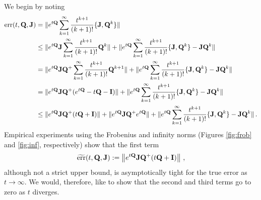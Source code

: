 \documentclass[12pt]{article} %
\begin{document}
We begin by noting
\begin{align}\label{eq:ub1}
	\mbox{err}(t,\mathbf{Q},\mathbf{J}) &=  \lVert  e^{t\mathbf{Q}}  \sum_{k=1}^\infty \frac{t^{k+1}}{(k+1)!} \{\mathbf{J},\mathbf{Q}^k\} \rVert \\ \nonumber
	&\leq  \lVert  e^{t\mathbf{Q}}\mathbf{J}  \sum_{k=1}^\infty \frac{t^{k+1}}{(k+1)!} \mathbf{Q}^k \rVert +   \lVert  e^{t\mathbf{Q}}  \sum_{k=1}^\infty \frac{t^{k+1}}{(k+1)!} \{\mathbf{J},\mathbf{Q}^k\} -\mathbf{J}\mathbf{Q}^k\rVert \\ \nonumber
		&=  \lVert  e^{t\mathbf{Q}}\mathbf{J} \mathbf{Q}^+  \sum_{k=1}^\infty \frac{t^{k+1}}{(k+1)!} \mathbf{Q}^{k+1} \rVert +   \lVert  e^{t\mathbf{Q}}  \sum_{k=1}^\infty \frac{t^{k+1}}{(k+1)!} \{\mathbf{J},\mathbf{Q}^k\} -\mathbf{J}\mathbf{Q}^k\rVert \\ \nonumber
		&=  \lVert  e^{t\mathbf{Q}}\mathbf{J} \mathbf{Q}^+ (e^{t\mathbf{Q}} - t\mathbf{Q} -\mathbf{I}) \rVert +   \lVert  e^{t\mathbf{Q}}  \sum_{k=1}^\infty \frac{t^{k+1}}{(k+1)!} \{\mathbf{J},\mathbf{Q}^k\} -\mathbf{J}\mathbf{Q}^k\rVert \\ \nonumber
			&\leq \lVert  e^{t\mathbf{Q}}\mathbf{J} \mathbf{Q}^+ ( t\mathbf{Q} +\mathbf{I}) \rVert  + \lVert  e^{t\mathbf{Q}}\mathbf{J} \mathbf{Q}^+ e^{t\mathbf{Q}} \rVert  +   \lVert  e^{t\mathbf{Q}}  \sum_{k=1}^\infty \frac{t^{k+1}}{(k+1)!} \{\mathbf{J},\mathbf{Q}^k\} -\mathbf{J}\mathbf{Q}^k\rVert \, .
\end{align}
Empirical experiments using the Frobenius and infinity norms (Figures \ref{fig:frob} and \ref{fig:inf}, respectively) show that the first term
\begin{align}
	\widetilde{\mbox{err}}(t,\mathbf{Q},\mathbf{J}) := \left\Vert e^{t\mathbf{Q}} \mathbf{J} \mathbf{Q}^+(t\mathbf{Q}+\mathbf{I})  \right\Vert \, ,
\end{align}
although not a strict upper bound, is asymptotically tight for the true error as $t\rightarrow \infty$. We would, therefore, like to show that the second and third terms go to zero as $t$ diverges.
\end{document}
